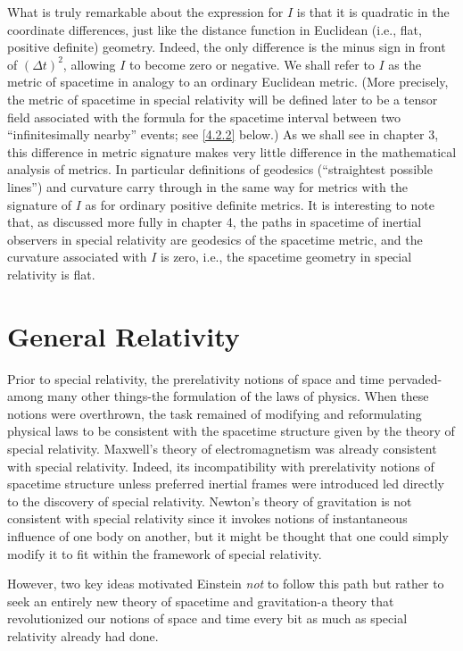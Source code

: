 What is truly remarkable about the expression for $I$ is that it is quadratic in the coordinate differences, just like the distance function in Euclidean (i.e., flat, positive definite) geometry. Indeed, the only difference is the minus sign in front of $(\Delta t)^2$, allowing $I$ to become zero or negative. We shall refer to $I$ as the metric of spacetime in analogy to an ordinary Euclidean metric. (More precisely, the metric of spacetime in special relativity will be defined later to be a tensor field associated with the formula for the spacetime interval between two ``infinitesimally nearby'' events; see \eqref{4.2.2} below.) As we shall see in chapter 3, this difference in metric signature makes very little difference in the mathematical analysis of metrics. In particular definitions of geodesics (``straightest possible lines'') and curvature carry through in the same way for metrics with the signature of $I$ as for ordinary positive definite metrics. It is interesting to note that, as discussed more fully in chapter 4, the paths in spacetime of inertial observers in special relativity are geodesics of the spacetime metric, and the curvature associated with $I$ is zero, i.e., the spacetime geometry in special relativity is flat.

\section{General Relativity}
Prior to special relativity, the prerelativity notions of space and time pervaded-among many other things-the formulation of the laws of physics. When these notions were overthrown, the task remained of modifying and reformulating physical laws to be consistent with the spacetime structure given by the theory of special relativity. Maxwell's theory of electromagnetism was already consistent with special relativity. Indeed, its incompatibility with prerelativity notions of spacetime structure unless preferred inertial frames were introduced led directly to the discovery of special relativity. Newton's theory of gravitation is not consistent with special relativity since it invokes notions of instantaneous influence of one body on another, but it might be thought that one could simply modify it to fit within the framework of special relativity.

However, two key ideas motivated Einstein \emph{not} to follow this path but rather to seek an entirely new theory of spacetime and gravitation-a theory that revolutionized our notions of space and time every bit as much as special relativity already had done.

